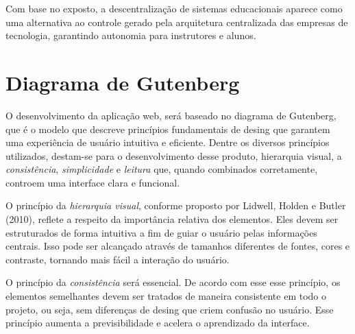 Com base no exposto, a descentralização de sistemas educacionais aparece como uma alternativa ao controle gerado pela arquitetura centralizada das empresas de tecnologia, garantindo autonomia para instrutores e alunos.


\section{Diagrama de Gutenberg}

O desenvolvimento da aplicação web, será baseado no diagrama de Gutenberg, que é o modelo que descreve princípios fundamentais de desing que garantem uma experiência de usuário intuitiva e eficiente. Dentre os diversos princípios utilizados, destam-se para o desenvolvimento desse produto, {hierarquia visual}, a \textit{consistência}, \textit{simplicidade} e \textit{leitura} que, quando combinados corretamente, controem uma interface clara e funcional.

O princípio da \textit{hierarquia visual}, conforme proposto por Lidwell, Holden e Butler (2010), reflete a respeito da importância relativa dos elementos. Eles devem ser estruturados de forma intuitiva a fim de guiar o usuário pelas informações centrais. Isso pode ser alcançado através de tamanhos diferentes de fontes, cores  e contraste, tornando mais fácil a interação do usuário.

O princípio da \textit{consistência} será essencial. De acordo com esse esse princípio, os elementos semelhantes devem ser tratados de maneira consistente em todo o projeto, ou seja, sem diferenças de desing que criem confusão no usuário. Esse princípio aumenta a previsibilidade e acelera o aprendizado da interface.

